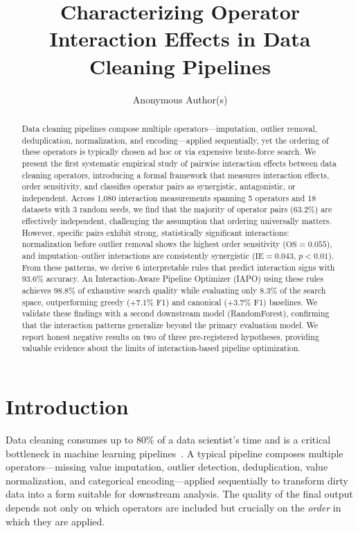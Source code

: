 \documentclass[preprint]{article}
\title{Characterizing Operator Interaction Effects in Data Cleaning Pipelines}
\author{
  Anonymous Author(s)
}
\newcommand{\ie}{\text{IE}}
\newcommand{\os}{\text{OS}}
\begin{document}
\maketitle

\begin{abstract}
Data cleaning pipelines compose multiple operators---imputation, outlier removal, deduplication, normalization, and encoding---applied sequentially, yet the ordering of these operators is typically chosen ad hoc or via expensive brute-force search. We present the first systematic empirical study of pairwise interaction effects between data cleaning operators, introducing a formal framework that measures interaction effects, order sensitivity, and classifies operator pairs as synergistic, antagonistic, or independent. Across 1,080 interaction measurements spanning 5 operators and 18 datasets with 3 random seeds, we find that the majority of operator pairs (63.2\%) are effectively independent, challenging the assumption that ordering universally matters. However, specific pairs exhibit strong, statistically significant interactions: normalization before outlier removal shows the highest order sensitivity ($\os = 0.055$), and imputation--outlier interactions are consistently synergistic ($\ie = 0.043$, $p < 0.01$). From these patterns, we derive 6 interpretable rules that predict interaction signs with 93.6\% accuracy. An Interaction-Aware Pipeline Optimizer (IAPO) using these rules achieves 98.8\% of exhaustive search quality while evaluating only 8.3\% of the search space, outperforming greedy (+7.1\% F1) and canonical (+3.7\% F1) baselines. We validate these findings with a second downstream model (RandomForest), confirming that the interaction patterns generalize beyond the primary evaluation model. We report honest negative results on two of three pre-registered hypotheses, providing valuable evidence about the limits of interaction-based pipeline optimization.
\end{abstract}

\section{Introduction}

Data cleaning consumes up to 80\% of a data scientist's time and is a critical bottleneck in machine learning pipelines~\citep{Chu2016DataCleaning}. A typical pipeline composes multiple operators---missing value imputation, outlier detection, deduplication, value normalization, and categorical encoding---applied sequentially to transform dirty data into a form suitable for downstream analysis. The quality of the final output depends not only on which operators are included but crucially on the \emph{order} in which they are applied.
\end{document}
